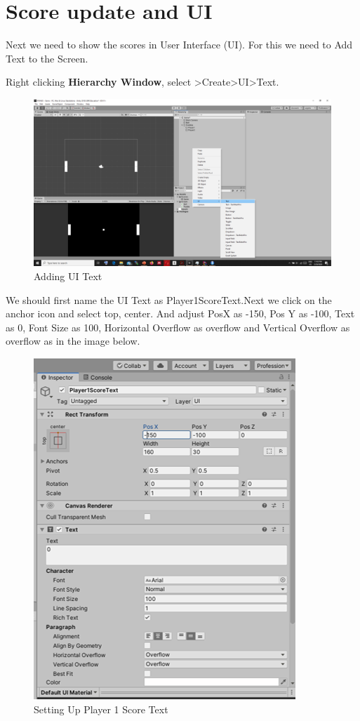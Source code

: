\documentclass[
]{book}
\begin{document}
\hypertarget{score-update-and-ui}{%
\section{Score update and UI}\label{score-update-and-ui}}

Next we need to show the scores in User Interface (UI). For this we need to Add Text to the Screen.

Right clicking \textbf{Hierarchy Window}, select \textgreater Create\textgreater UI\textgreater Text.

\begin{figure}
\centering
\includegraphics{Images/UIText.png}
\caption{Adding UI Text}
\end{figure}

We should first name the UI Text as Player1ScoreText.Next we click on the anchor icon and select top, center. And adjust PosX as -150, Pos Y as -100, Text as 0, Font Size as 100, Horizontal Overflow as overflow and Vertical Overflow as overflow as in the image below.

\begin{figure}
\centering
\includegraphics{Images/Player1ScoreText.png}
\caption{Setting Up Player 1 Score Text}
\end{figure}
\end{document}
